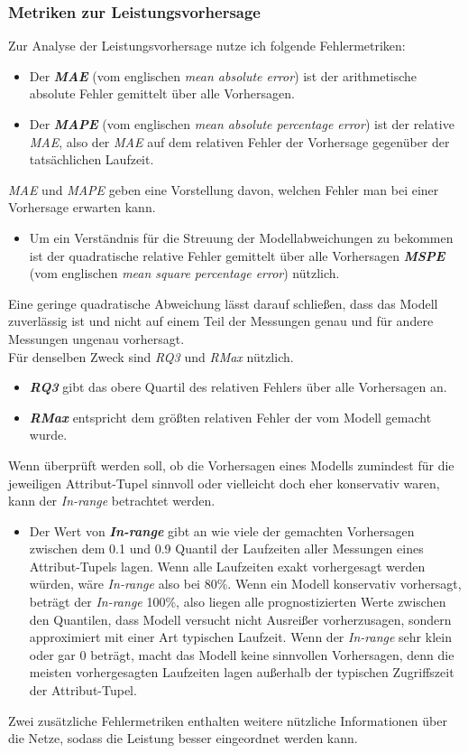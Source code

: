 \documentclass[
	twoside,
	12pt,
	a4paper,
	BCOR10mm,
	DIV14,
	listof=totoc,
	bibliography=totoc,
	headsepline
]{scrreprt}
\begin{document}
\subsubsection{Metriken zur Leistungsvorhersage}
Zur Analyse der Leistungsvorhersage nutze ich folgende Fehlermetriken:
\begin{itemize}
	\item Der \textit{\textbf{MAE}} (vom englischen \textit{mean absolute error}) ist der arithmetische absolute Fehler gemittelt über alle Vorhersagen.
	\item Der \textit{\textbf{MAPE}} (vom englischen \textit{mean absolute percentage error}) ist der relative \textit{MAE}, also der \textit{MAE} auf dem relativen Fehler der Vorhersage gegenüber der tatsächlichen Laufzeit.\\
\end{itemize}
\textit{MAE} und \textit{MAPE} geben eine Vorstellung davon, welchen Fehler man bei einer Vorhersage erwarten kann.
\begin{itemize}
	\item Um ein Verständnis für die Streuung der Modellabweichungen zu bekommen ist der quadratische relative Fehler gemittelt über alle Vorhersagen \textit{\textbf{MSPE}} (vom englischen \textit{mean square percentage error}) nützlich.
\end{itemize}
	Eine geringe quadratische Abweichung lässt darauf schließen, dass das Modell zuverlässig ist und nicht auf einem Teil der Messungen genau und für andere Messungen ungenau vorhersagt.\\
	Für denselben Zweck sind \textit{RQ3} und \textit{RMax} nützlich.
\begin{itemize}
	\item \textit{\textbf{RQ3}} gibt das obere Quartil des relativen Fehlers über alle Vorhersagen an.
	\item \textit{\textbf{RMax}} entspricht dem größten relativen Fehler der vom Modell gemacht wurde.
\end{itemize}
Wenn überprüft werden soll, ob die Vorhersagen eines Modells zumindest für die jeweiligen Attribut-Tupel sinnvoll oder vielleicht doch eher konservativ waren, kann der \textit{In-range} betrachtet werden.
\begin{itemize}
	\item Der Wert von \textit{\textbf{In-range}} gibt an wie viele der gemachten Vorhersagen zwischen dem 0.1 und 0.9 Quantil der Laufzeiten aller Messungen eines Attribut-Tupels lagen.
	Wenn alle Laufzeiten exakt vorhergesagt werden würden, wäre \textit{In-range} also bei 80\%. Wenn ein Modell konservativ vorhersagt, beträgt der \textit{In-range} 100\%, also liegen alle prognostizierten Werte zwischen den Quantilen, dass Modell \glqq versucht\grqq{} nicht Ausreißer vorherzusagen, sondern approximiert mit einer Art typischen Laufzeit. 
	Wenn der \textit{In-range} sehr klein oder gar 0 beträgt, macht das Modell keine sinnvollen Vorhersagen, denn die meisten vorhergesagten Laufzeiten lagen außerhalb der typischen Zugriffszeit der Attribut-Tupel.
\end{itemize}
Zwei zusätzliche Fehlermetriken enthalten weitere nützliche Informationen über die Netze, sodass die Leistung besser eingeordnet werden kann.
\end{document}
